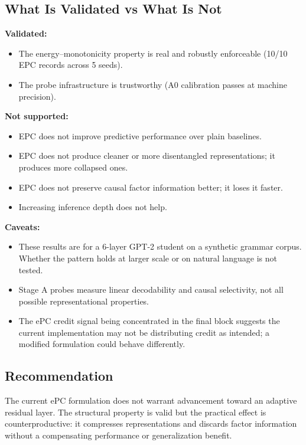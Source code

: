 \documentclass[11pt,a4paper]{article}
\begin{document}
\subsection{What Is Validated vs What Is Not}

\textbf{Validated:}
\begin{itemize}[nosep]
  \item The energy--monotonicity property is real and robustly
    enforceable (10/10 EPC records across 5 seeds).
  \item The probe infrastructure is trustworthy (A0 calibration passes
    at machine precision).
\end{itemize}

\textbf{Not supported:}
\begin{itemize}[nosep]
  \item EPC does not improve predictive performance over plain
    baselines.
  \item EPC does not produce cleaner or more disentangled
    representations; it produces more collapsed ones.
  \item EPC does not preserve causal factor information better; it
    loses it faster.
  \item Increasing inference depth does not help.
\end{itemize}

\textbf{Caveats:}
\begin{itemize}[nosep]
  \item These results are for a 6-layer GPT-2 student on a synthetic
    grammar corpus.  Whether the pattern holds at larger scale or on
    natural language is not tested.
  \item Stage A probes measure linear decodability and causal
    selectivity, not all possible representational properties.
  \item The ePC credit signal being concentrated in the final block
    suggests the current implementation may not be distributing credit
    as intended; a modified formulation could behave differently.
\end{itemize}

\subsection{Recommendation}

The current ePC formulation does not warrant advancement toward an
adaptive residual layer.  The structural property is valid but the
practical effect is counterproductive: it compresses representations
and discards factor information without a compensating performance or
generalization benefit.
\end{document}
